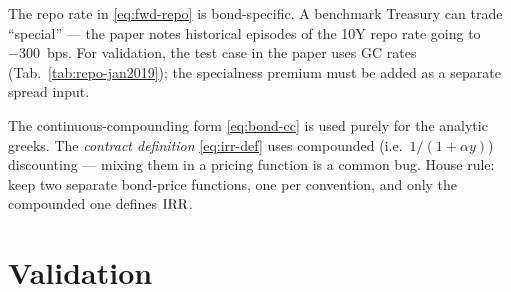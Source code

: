 \documentclass[11pt,a4paper]{article}
\begin{document}
\begin{commentary}
The repo rate in \eqref{eq:fwd-repo} is bond-specific. A benchmark
Treasury can trade ``special'' --- the paper notes historical episodes
of the 10Y repo rate going to $-300$~bps. For validation, the test
case in the paper uses GC rates (Tab.~\ref{tab:repo-jan2019}); the
specialness premium must be added as a separate spread input.
\end{commentary}

\begin{commentary}
The continuous-compounding form \eqref{eq:bond-cc} is used purely for
the analytic greeks. The \emph{contract definition} \eqref{eq:irr-def}
uses compounded (i.e.\ $1/(1+\alpha y)$) discounting --- mixing them
in a pricing function is a common bug. House rule: keep two separate
bond-price functions, one per convention, and only the compounded
one defines $\mathrm{IRR}$.
\end{commentary}

\section{Validation}
\end{document}
